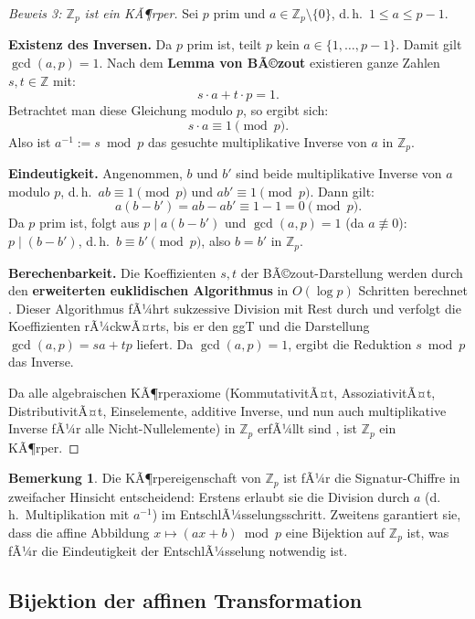 ﻿\documentclass[a4paper,12pt]{scrreprt}
\theoremstyle{definition}
\newtheorem{bemerkung}{Bemerkung}[section]
\begin{document}
\begin{proof}[Beweis 3: $\mathbb{Z}_p$ ist ein KÃ¶rper]
	Sei $p$ prim und $a \in \mathbb{Z}_p \setminus \{0\}$, d.\,h.\ $1 \leq a \leq p-1$.
	
	\textbf{Existenz des Inversen.} Da $p$ prim ist, teilt $p$ kein $a \in \{1,\ldots,p-1\}$. Damit gilt $\gcd(a, p) = 1$. Nach dem \textbf{Lemma von BÃ©zout} existieren ganze Zahlen $s, t \in \mathbb{Z}$ mit:
	\[
	s \cdot a + t \cdot p = 1.
	\]
	Betrachtet man diese Gleichung modulo $p$, so ergibt sich:
	\[
	s \cdot a \equiv 1 \pmod{p}.
	\]
	Also ist $a^{-1} := s \bmod p$ das gesuchte multiplikative Inverse von $a$ in $\mathbb{Z}_p$.
	
	\textbf{Eindeutigkeit.} Angenommen, $b$ und $b'$ sind beide multiplikative Inverse von $a$ modulo $p$, d.\,h.\ $ab \equiv 1 \pmod{p}$ und $ab' \equiv 1 \pmod{p}$. Dann gilt:
	\[
	a(b - b') = ab - ab' \equiv 1 - 1 = 0 \pmod{p}.
	\]
	Da $p$ prim ist, folgt aus $p \mid a(b - b')$ und $\gcd(a, p) = 1$ (da $a \not\equiv 0$): $p \mid (b - b')$, d.\,h.\ $b \equiv b' \pmod{p}$, also $b = b'$ in $\mathbb{Z}_p$.
	
	\textbf{Berechenbarkeit.} Die Koeffizienten $s, t$ der BÃ©zout-Darstellung werden durch den \textbf{erweiterten euklidischen Algorithmus} in $O(\log p)$ Schritten berechnet \cite{Buc16}. Dieser Algorithmus fÃ¼hrt sukzessive Division mit Rest durch und verfolgt die Koeffizienten rÃ¼ckwÃ¤rts, bis er den ggT und die Darstellung $\gcd(a,p) = sa + tp$ liefert. Da $\gcd(a,p) = 1$, ergibt die Reduktion $s \bmod p$ das Inverse.
	
	Da alle algebraischen KÃ¶rperaxiome (KommutativitÃ¤t, AssoziativitÃ¤t, DistributivitÃ¤t, Einselemente, additive Inverse, und nun auch multiplikative Inverse fÃ¼r alle Nicht-Nullelemente) in $\mathbb{Z}_p$ erfÃ¼llt sind \cite{KL15}, ist $\mathbb{Z}_p$ ein KÃ¶rper.
\end{proof}

\begin{bemerkung}
	Die KÃ¶rpereigenschaft von $\mathbb{Z}_p$ ist fÃ¼r die Signatur-Chiffre in zweifacher Hinsicht entscheidend: Erstens erlaubt sie die Division durch $a$ (d.\,h.\ Multiplikation mit $a^{-1}$) im EntschlÃ¼sselungsschritt. Zweitens garantiert sie, dass die affine Abbildung $x \mapsto (ax + b) \bmod p$ eine Bijektion auf $\mathbb{Z}_p$ ist, was fÃ¼r die Eindeutigkeit der EntschlÃ¼sselung notwendig ist.
\end{bemerkung}

\subsection{Bijektion der affinen Transformation}
\end{document}
